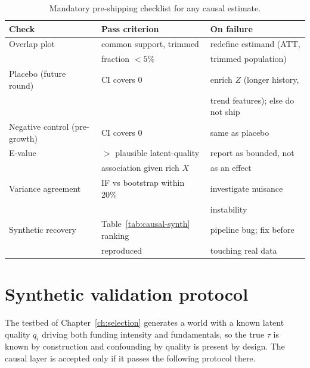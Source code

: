 \begin{table}[htbp]
\centering
\caption{Mandatory pre-shipping checklist for any causal estimate.}
\label{tab:causal-checklist}
\small
\begin{tabular}{@{}lll@{}}
\toprule
Check & Pass criterion & On failure \\
\midrule
Overlap plot & common support, trimmed & redefine estimand (ATT, \\
 & fraction $< 5\%$ & trimmed population) \\
Placebo (future round) & CI covers 0 & enrich $Z$ (longer history, \\
 & & trend features); else do not ship \\
Negative control (pre-growth) & CI covers 0 & same as placebo \\
E-value & $>$ plausible latent-quality & report as bounded, not \\
 & association given rich $X$ & as an effect \\
Variance agreement & IF vs bootstrap within 20\% & investigate nuisance \\
 & & instability \\
Synthetic recovery & Table~\ref{tab:causal-synth} ranking & pipeline bug; fix before \\
 & reproduced & touching real data \\
\bottomrule
\end{tabular}
\end{table}

\section{Synthetic validation protocol}
\label{sec:causal-synth}

The testbed of Chapter~\ref{ch:selection} generates a world with a known latent quality
$q_i$ driving both funding intensity and fundamentals, so the true $\tau$ is known by
construction and confounding by quality is present by design. The causal layer is
accepted only if it passes the following protocol there.

